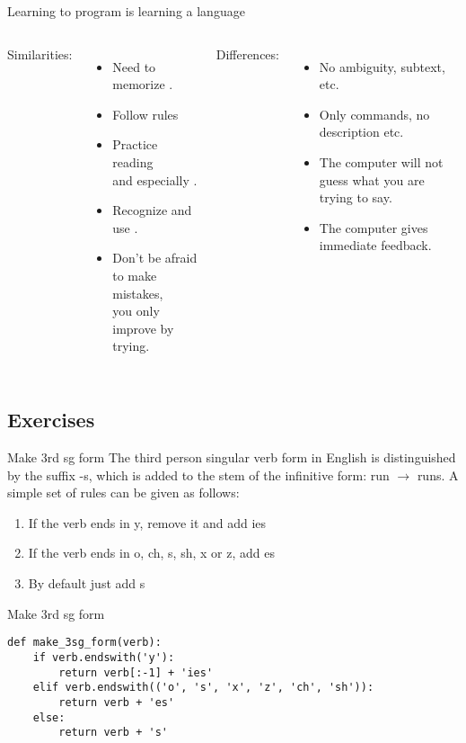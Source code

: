 \documentclass[aspectratio=169,usenames,dvipsnames]{beamer}
\begin{document}
\begin{frame}{Learning to program is learning a language}
\begin{columns}[T]
Similarities:
\begin{itemize}
	\item Need to memorize .
	\item Follow  rules
	\item Practice reading \\
			and especially .
	\item Recognize and use .
	\item Don't be afraid to make mistakes, \\
		you only improve by trying.
\end{itemize}
\pause Differences:
\begin{itemize}
	\item No ambiguity, subtext, etc.
	\item Only commands, no description etc.
	\item The computer will not guess what you are trying to say.
	\item The computer gives immediate feedback.
\end{itemize}
\end{columns}
\end{frame}


\subsection{Exercises}
\begin{frame}{Make 3rd sg form}
The third person singular verb form in English is distinguished by the suffix
-s, which is added to the stem of the infinitive form: run $\rightarrow$ runs.
A simple set of rules can be given as follows:
\begin{enumerate}
    \item If the verb ends in y, remove it and add ies
    \item If the verb ends in o, ch, s, sh, x or z, add es
    \item By default just add s
\end{enumerate}
\end{frame}

\begin{frame}[fragile]{Make 3rd sg form}
\begin{lstlisting}
def make_3sg_form(verb):
    if verb.endswith('y'):
        return verb[:-1] + 'ies'
    elif verb.endswith(('o', 's', 'x', 'z', 'ch', 'sh')):
        return verb + 'es'
    else:
        return verb + 's'
\end{lstlisting}
\end{frame}
\end{document}

